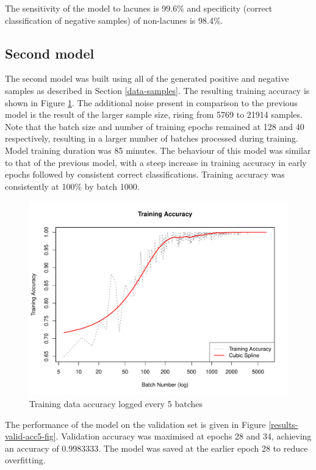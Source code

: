 The sensitivity of the model to lacunes is 99.6\% and specificity (correct classification of negative samples) of non-lacunes is 98.4\%.

\subsection*{Second model}

The second model was built using all of the generated positive and negative samples as described in Section \ref{data-samples}. The resulting training accuracy is shown in Figure \ref{results-train-acc5-fig}. The additional noise present in comparison to the previous model is the result of the larger sample size, rising from 5769 to 21914 samples. Note that the batch size and number of training epochs remained at 128 and 40 respectively, resulting in a larger number of batches processed during training. Model training duration was 85 minutes. The behaviour of this model was similar to that of the previous model, with a steep increase in training accuracy in early epochs followed by consistent correct classifications. Training accuracy was consistently at 100\% by batch 1000. 

\begin{figure}[ht]
	\centering
	\includegraphics[width=\textwidth]{Images/7_train_acc5.pdf}
	\caption{Training data accuracy logged every 5 batches}
	\label{results-train-acc5-fig}
\end{figure}

The performance of the model on the validation set is given in Figure \ref{results-valid-acc5-fig}. Validation accuracy was maximised at epochs 28 and 34, achieving an accuracy of 0.9983333. The model was saved at the earlier epoch 28 to reduce overfitting.

